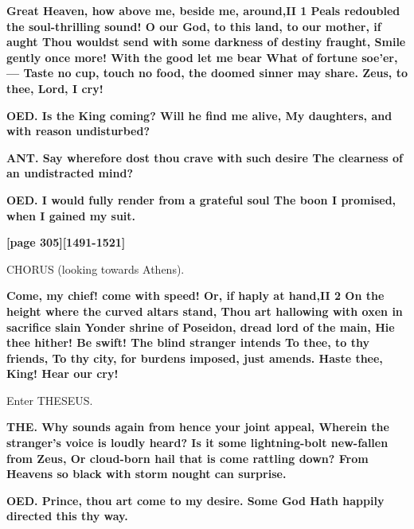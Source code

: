\documentclass[11pt,letter]{book}
\begin{document}
\par \textbf{Great Heaven, how above me, beside me, around,II 1 Peals redoubled the soul-thrilling sound! O our God, to this land, to our mother, if aught Thou wouldst send with some darkness of destiny fraught, Smile gently once more! With the good let me bear What of fortune soe’er,— Taste no cup, touch no food, the doomed sinner may share. Zeus, to thee, Lord, I cry!}
\par 

\par \textbf{OED. Is the King coming? Will he find me alive, My daughters, and with reason undisturbed?}
\par 

\par \textbf{ANT. Say wherefore dost thou crave with such desire The clearness of an undistracted mind?}
\par 

\par \textbf{OED. I would fully render from a grateful soul The boon I promised, when I gained my suit.}
\par 

\par \textbf{[page 305][1491-1521]}
\par 

\par  CHORUS (looking towards Athens).

\par \textbf{Come, my chief! come with speed! Or, if haply at hand,II 2 On the height where the curved altars stand, Thou art hallowing with oxen in sacrifice slain Yonder shrine of Poseidon, dread lord of the main, Hie thee hither! Be swift! The blind stranger intends To thee, to thy friends, To thy city, for burdens imposed, just amends. Haste thee, King! Hear our cry!}
\par 

\par  Enter THESEUS.

\par \textbf{THE. Why sounds again from hence your joint appeal, Wherein the stranger’s voice is loudly heard? Is it some lightning-bolt new-fallen from Zeus, Or cloud-born hail that is come rattling down? From Heavens so black with storm nought can surprise.}
\par 

\par \textbf{OED. Prince, thou art come to my desire. Some God Hath happily directed this thy way.}
\par 
\end{document}
